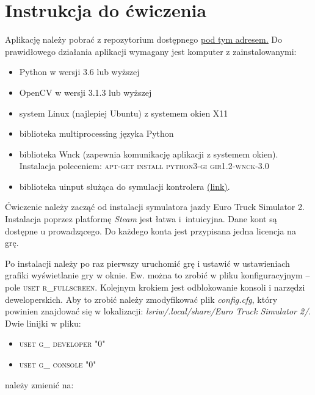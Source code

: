 \chapter{Instrukcja do ćwiczenia}


Aplikację należy pobrać z repozytorium dostępnego
\href{https://github.com/jaroslaw-b/ETS2_test_environment}{\underline{pod tym adresem.}}
Do prawidłowego działania aplikacji wymagany jest komputer z zainstalowanymi:
\begin{itemize}
\item Python w wersji 3.6 lub wyższej
\item OpenCV w wersji 3.1.3 lub wyższej %

\item system Linux (najlepiej Ubuntu) z systemem okien X11
\item biblioteka multiprocessing języka Python
\item biblioteka Wnck (zapewnia komunikację aplikacji z systemem okien). Instalacja poleceniem: \textsc{apt-get install python3-gi gir1.2-wnck-3.0}
\item biblioteka uinput służąca do symulacji kontrolera \href{https://github.com/tuomasjjrasanen/python-uinput}{(\underline{link)}}.
\end{itemize}



Ćwiczenie należy zacząć od instalacji symulatora jazdy Euro Truck Simulator 2. 
Instalacja poprzez platformę \textit{Steam} jest łatwa i~intuicyjna. 
Dane kont są dostępne u prowadzącego. 
Do każdego konta jest przypisana jedna licencja na grę.

Po instalacji należy po raz pierwszy uruchomić grę i ustawić w ustawieniach grafiki wyświetlanie gry w oknie.
Ew. można to zrobić w pliku konfiguracyjnym -- pole \textsc{uset r\_fullscreen}.
Kolejnym krokiem jest odblokowanie konsoli i narzędzi deweloperskich. 
Aby to zrobić należy zmodyfikować plik \textit{config.cfg}, który powinien znajdować się w lokalizacji: \textit{lsriw/.local/share/Euro Truck Simulator 2/}. 
Dwie linijki w pliku:
\begin{itemize}
\item \textsc{uset g\_ developer "0"}
\item \textsc{uset g\_ console "0"}
\end{itemize}

należy zmienić na:

